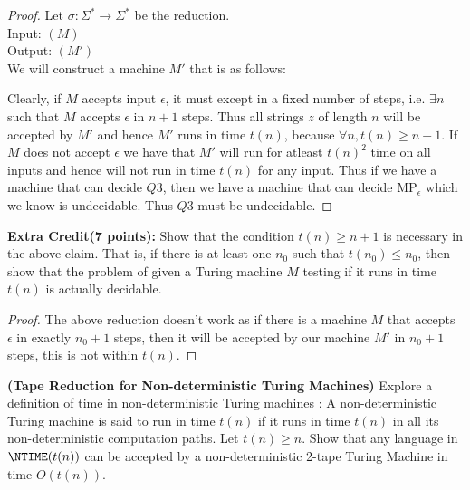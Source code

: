\documentclass[solution,addpoints,12pt]{exam}
\renewcommand{\MP}{\ensuremath{\mathrm{MP}}\xspace}
\begin{document}
\begin{questions}
\begin{solution}
\begin{proof}
			 Let $\sigma : \Sigma^* \rightarrow \Sigma^*$ be the reduction.
			 \\
			 Input: $(M)$
			 \\
			 Output: $(M')$
			 \\
			 We will construct a machine $M'$ that is as follows:
			 \\
			 \begin{center}
			 \end{center}
			 Clearly, if $M$ accepts input $\epsilon$, it must except in a fixed number of steps, i.e. $\exists n$ such that $M$ accepts $\epsilon$ in $n+1$ steps. Thus all strings $z$ of length $n$ will be accepted by $M'$ and hence $M'$ runs in time $t(n)$, because $\forall n, t(n) \geq n+1$. If $M$ does not accept $\epsilon$ we have that $M'$ will run for atleast $t(n)^2$ time  on all inputs and hence will not run in time $t(n)$ for any input. Thus if we have a machine that can decide $Q3$, then we have a machine that can decide $\MP_\epsilon$ which we know is undecidable. Thus $Q3$ must be undecidable.
	\end{proof}
\end{solution}
\textbf{Extra Credit(7 points):} Show that the condition $t(n) \ge n+1$ is necessary in the above claim. That is, if there is at least one $n_0$ such that $t(n_0) \le n_0$, then show that the problem of given a Turing machine $M$ testing if it runs in time $t(n)$ is actually decidable.
\begin{solution}
	\begin{proof}
		The above reduction doesn't work as if there is a machine $M$ that accepts $\epsilon$ in exactly $n_0 + 1$ steps, then it will be accepted by our machine $M'$ in $n_0+1$ steps, this is not within $t(n)$. 
	\end{proof}
\end{solution}
\question[7]\textbf{(Tape Reduction for Non-deterministic Turing Machines)}
Explore a definition of time in non-deterministic Turing machines : A non-deterministic Turing machine is said to run in time $t(n)$ if it runs in time $t(n)$ in all its non-deterministic computation paths. Let $t(n) \ge n$. Show that any language in $\NTIME(t(n))$ can be accepted by a non-deterministic 2-tape Turing Machine in time $O(t(n))$.


\end{questions}
\end{document}
